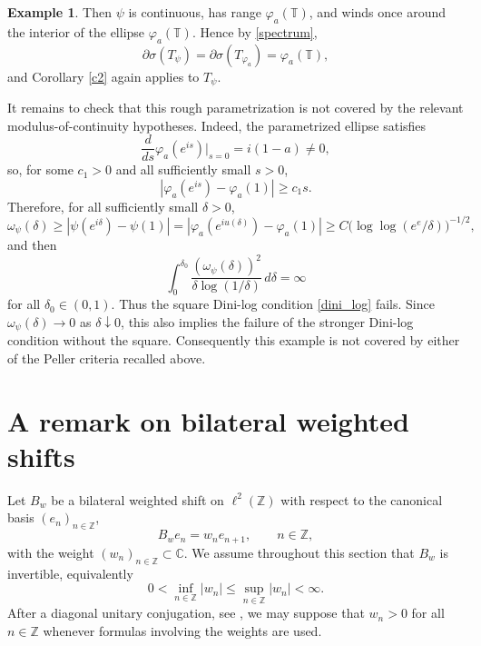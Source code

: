\documentclass[11pt]{amsart}
\numberwithin{equation}{section}
\theoremstyle{definition}
\newtheorem{example}[theorem]{Example}
\theoremstyle{remark}
\begin{document}
\begin{example}
Then \(\psi\) is continuous, has range \(\varphi_a(\mathbb T)\), and winds once around the interior of the ellipse \(\varphi_a(\mathbb T)\).
Hence by \eqref{spectrum},
\[
        \partial\sigma(T_\psi)=\partial\sigma(T_{\varphi_a})
        =\varphi_a(\mathbb T),
\]
and Corollary \ref{c2} again applies to \(T_\psi\).




It remains to check that this rough parametrization is not covered by the relevant
modulus-of-continuity hypotheses.
Indeed, the parametrized ellipse satisfies
$$
    \frac d{ds}\varphi_a(e^{is})\bigg|_{s=0}=i(1-a)\ne0,
$$
so, for some $c_1>0$ and all sufficiently small $s>0$,
$$
    |\varphi_a(e^{is})-\varphi_a(1)|\ge c_1s.
$$
Therefore, for all sufficiently small $\delta>0$,
$$
    \omega_\psi(\delta)
    \ge |\psi(e^{i\delta})-\psi(1)|
    = |\varphi_a(e^{iu(\delta)})-\varphi_a(1)|
    \ge C\bigl(\log\log(e^e/\delta)\bigr)^{-1/2},
$$
and then
$$
 \int_0^{\delta_0}
 \frac{(\omega_\psi(\delta))^2}
   {\delta\log(1/\delta)}\,d\delta=\infty
$$
for all $\delta_0\in (0,1).$
Thus the square Dini-log condition \eqref{dini_log} fails. Since $\omega_\psi(\delta)\to0$ as $\delta\downarrow0$, this also implies the failure of the stronger Dini-log condition without the square. Consequently this example is not covered by either of the Peller criteria recalled above.
\end{example}



\section{A remark on bilateral weighted shifts}
\label{sec:annular-bilateral}

Let $B_w$ be a bilateral weighted shift on $\ell^2(\mathbb Z)$ with respect
to the canonical basis $(e_n)_{n\in\mathbb Z}$,
\[
    B_we_n=w_ne_{n+1},\qquad n\in\mathbb Z,
\]
with the weight $(w_n)_{n \in \mathbb Z}\subset \mathbb C.$
We assume throughout this section that $B_w$ is invertible, equivalently
\[
    0<\inf_{n\in\mathbb Z}|w_n|\le \sup_{n\in\mathbb Z}|w_n|<\infty .
\]
After a diagonal unitary conjugation, see \cite[Corollary~1]{Sh}, we may
suppose that $w_n>0$ for all $n\in\mathbb Z$ whenever formulas involving the
weights are used.
\end{document}
